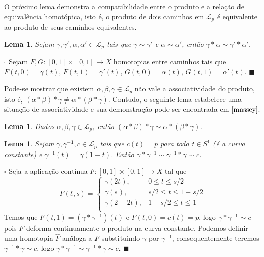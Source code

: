 \documentclass[12pt]{book}
\newtheorem{lema}[teorema]{Lema}
\newenvironment{prova}[1]{$\square$ #1}{\hfill$\blacksquare$}
\newcommand{\caminhospontobase}[1]{\mathcal{L}_{#1}}
\newcommand{\circulo}{S^{1}}
\newcommand{\vermelho}[1]{{\color{red}#1}}
\begin{document}
	O próximo lema demonstra a compatibilidade entre o produto e a relação de equivalência homotópica, isto é, o produto de dois caminhos em $\caminhospontobase{p}$ é equivalente ao produto de seus caminhos equivalentes.
	
	\begin{lema}\label{lema_compatibilidade_produto_caminhos}
		Sejam $\gamma, \gamma', \alpha, \alpha' \in \caminhospontobase{p}$ tais que $\gamma \sim \gamma'$ e $\alpha \sim \alpha'$, então $\gamma * \alpha \sim \gamma' * \alpha'$.
	\end{lema}
	\begin{prova}
		\vermelho{
			Sejam  $F, G:[0,1] \times [0,1] \to X$ homotopias entre caminhos tais que $F(t,0)=\gamma(t)$, $F(t,1)=\gamma'(t)$, $G(t,0)=\alpha(t)$, $G(t,1)=\alpha'(t)$.}
	\end{prova}
	
	Pode-se mostrar que existem $\alpha, \beta, \gamma \in \caminhospontobase{p}$ não vale a associatividade do produto, isto é, $(\alpha*\beta)*\gamma \neq \alpha*(\beta*\gamma)$. Contudo, o seguinte lema estabelece uma situação de associatividade e sua demonstração pode ser encontrada em $\cite{massey}$.
	
	\begin{lema}\label{lema_associatividade_produto_caminhos}
		Dados $\alpha, \beta, \gamma \in \caminhospontobase{p}$, então $(\alpha*\beta)*\gamma \sim \alpha*(\beta*\gamma)$.
	\end{lema}
	
	\begin{lema}\label{lema_caminho_inverso}
		Sejam $\gamma, \gamma^{-1}, c \in \caminhospontobase{p}$ tais que $c(t) = p$ para todo $t\in \circulo$ (é a curva constante) e $\gamma^{-1}(t) = \gamma(1-t)$. Então $\gamma*\gamma^{-1} \sim \gamma^{-1}*\gamma \sim c$.
	\end{lema} 	
	\begin{prova}
		Seja a aplicação contínua $F:[0,1]\times [0,1]\to X$ tal que
		$$
			F(t,s) = 
			\left\{
			\begin{array}{cc}
				\gamma(2t), & 0\leq t \leq s/2\\
				\gamma(s), & s/2 \leq t \leq 1-s/2\\
				\gamma(2-2t), & 1-s/2 \leq t \leq 1\\
			\end{array}
			\right.
		$$
		Temos que $F(t,1) = (\gamma*\gamma^{-1})(t)$ e $F(t,0) = c(t) = p$, logo $\gamma*\gamma^{-1}\sim c$ pois $F$ deforma continuamente o produto na curva constante. Podemos definir uma homotopia $\hat{F}$ análoga a $F$ substituindo $\gamma$ por $\gamma^{-1}$, consequentemente teremos $\gamma^{-1}*\gamma \sim c$, logo $\gamma*\gamma^{-1} \sim \gamma^{-1}*\gamma \sim c$.
	\end{prova}
	
\end{document}
